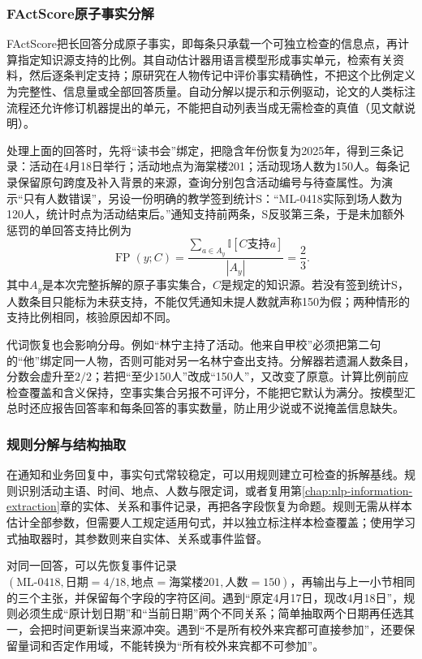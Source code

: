 \subsubsection{FActScore原子事实分解}
\label{sec:nlp-dialogue-factscore}

FActScore把长回答分成原子事实，即每条只承载一个可独立检查的信息点，再计算指定知识源支持的比例。其自动估计器用语言模型形成事实单元，检索有关资料，然后逐条判定支持；原研究在人物传记中评价事实精确性，不把这个比例定义为完整性、信息量或全部回答质量。自动分解以提示和示例驱动，论文的人类标注流程还允许修订机器提出的单元，不能把自动列表当成无需检查的真值（见文献说明）。

处理上面的回答时，先将“读书会”绑定，把隐含年份恢复为2025年，得到三条记录：活动在4月18日举行；活动地点为海棠楼201；活动现场人数为150人。每条记录保留原句跨度及补入背景的来源，查询分别包含活动编号与待查属性。为演示“只有人数错误”，另设一份明确的教学签到统计S：“ML-0418实际到场人数为120人，统计时点为活动结束后。”通知支持前两条，S反驳第三条，于是未加额外惩罚的单回答支持比例为
\begin{equation}
 \operatorname{FP}(y;C)=
 \frac{\sum_{a\in A_y}\mathbb{I}[C\text{支持}a]}{|A_y|}
 =\frac{2}{3}.
 \label{eq:nlp-dialogue-factscore}
\end{equation}
其中$A_y$是本次完整拆解的原子事实集合，$C$是规定的知识源。若没有签到统计S，人数条目只能标为未获支持，不能仅凭通知未提人数就声称150为假；两种情形的支持比例相同，核验原因却不同。

代词恢复也会影响分母。例如“林宁主持了活动。他来自甲校”必须把第二句的“他”绑定同一人物，否则可能对另一名林宁查出支持。分解器若遗漏人数条目，分数会虚升至$2/2$；若把“至少150人”改成“150人”，又改变了原意。计算比例前应检查覆盖和含义保持，空事实集合另报不可评分，不能把它默认为满分。按模型汇总时还应报告回答率和每条回答的事实数量，防止用少说或不说掩盖信息缺失。

\subsubsection{规则分解与结构抽取}
\label{sec:nlp-dialogue-rule-claims}

在通知和业务回复中，事实句式常较稳定，可以用规则建立可检查的拆解基线。规则识别活动主语、时间、地点、人数与限定词，或者复用第\ref{chap:nlp-information-extraction}章的实体、关系和事件记录，再把各字段恢复为命题。规则无需从样本估计全部参数，但需要人工规定适用句式，并以独立标注样本检查覆盖；使用学习式抽取器时，其参数则来自实体、关系或事件监督。

对同一回答，可以先恢复事件记录$(\text{ML-0418},\text{日期}=4/18,\text{地点}=\text{海棠楼201},\text{人数}=150)$，再输出与上一小节相同的三个主张，并保留每个字段的字符区间。遇到“原定4月17日，现改4月18日”，规则必须生成“原计划日期”和“当前日期”两个不同关系；简单抽取两个日期再任选其一，会把时间更新误当来源冲突。遇到“不是所有校外来宾都可直接参加”，还要保留量词和否定作用域，不能转换为“所有校外来宾都不可参加”。

